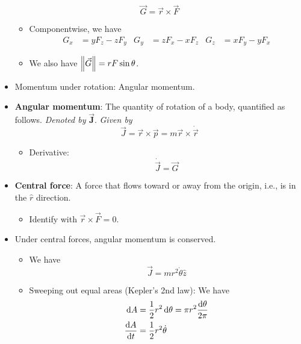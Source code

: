 \documentclass[../notes.tex]{subfiles}
\begin{document}
\begin{itemize}
    \begin{equation*}
        \vec{G} = \vec{r}\times\vec{F}
    \end{equation*}
    \begin{itemize}
        \item Componentwise, we have
        \begin{align*}
            G_x &= yF_z-zF_y&
            G_y &= zF_x-xF_z&
            G_z &= xF_y-yF_x
        \end{align*}
        \item We also have $\norm{\vec{G}}=rF\sin\theta$.
    \end{itemize}
    \item Momentum under rotation: Angular momentum.
    \item \textbf{Angular momentum}: The quantity of rotation of a body, quantified as follows. \emph{Denoted by} $\bm{\vec{J}}$. \emph{Given by}
    \begin{equation*}
        \vec{J} = \vec{r}\times\vec{p}
        = m\vec{r}\times\dot{\vec{r}}
    \end{equation*}
    \begin{itemize}
        \item Derivative:
        \begin{equation*}
            \dot{\vec{J}} = \vec{G}
        \end{equation*}
    \end{itemize}
    \item \textbf{Central force}: A force that flows toward or away from the origin, i.e., is in the $\hat{r}$ direction.
    \begin{itemize}
        \item Identify with $\vec{r}\times\vec{F}=0$.
    \end{itemize}
    \item Under central forces, angular momentum is conserved.
    \begin{itemize}
        \item We have
        \begin{equation*}
            \vec{J} = mr^2\dot{\theta}\hat{z}
        \end{equation*}
        \item Sweeping out equal areas (Kepler's 2nd law): We have
        \begin{align*}
            \dd{A} &= \frac{1}{2}r^2\dd{\theta} = \pi r^2\frac{\dd{\theta}}{2\pi}\\
            \dv{A}{t} &= \frac{1}{2}r^2\dot{\theta}
        \end{align*}
    \end{itemize}
\end{itemize}
\end{document}
